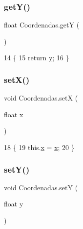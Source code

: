 \subsubsection{\texorpdfstring{get\+Y()}{getY()}}
{\footnotesize\ttfamily float Coordenadas.\+getY (\begin{DoxyParamCaption}{ }\end{DoxyParamCaption})\hspace{0.3cm}{\ttfamily [inline]}}


\begin{DoxyCode}
14                         \{
15         \textcolor{keywordflow}{return} \mbox{\hyperlink{class_coordenadas_a6b4555727809eb63ae63e171533476b8}{y}};
16     \}
\end{DoxyCode}
\mbox{\label{class_coordenadas_a8b46e4301e0e9699d03e3e3886113c75}} 
\subsubsection{\texorpdfstring{set\+X()}{setX()}}
{\footnotesize\ttfamily void Coordenadas.\+setX (\begin{DoxyParamCaption}\item[{float}]{x }\end{DoxyParamCaption})\hspace{0.3cm}{\ttfamily [inline]}}


\begin{DoxyCode}
18                               \{
19         this.\mbox{\hyperlink{class_coordenadas_a89574ed799dfc39e198c8e8096670bf1}{x}} = \mbox{\hyperlink{class_coordenadas_a89574ed799dfc39e198c8e8096670bf1}{x}};
20     \}
\end{DoxyCode}
\mbox{\label{class_coordenadas_a44fda770399a973175381ded0e88f1c0}} 
\subsubsection{\texorpdfstring{set\+Y()}{setY()}}
{\footnotesize\ttfamily void Coordenadas.\+setY (\begin{DoxyParamCaption}\item[{float}]{y }\end{DoxyParamCaption})\hspace{0.3cm}{\ttfamily [inline]}}


